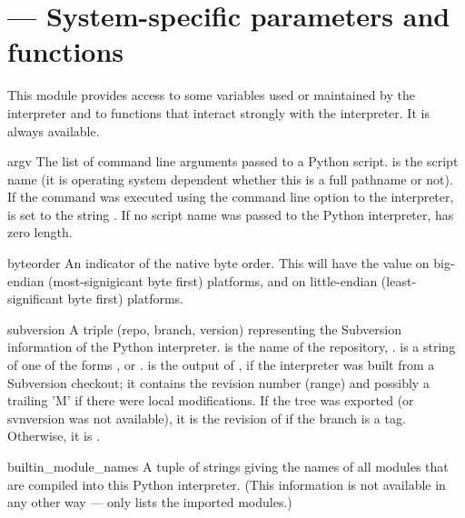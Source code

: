 \section{ ---
         System-specific parameters and functions}


This module provides access to some variables used or maintained by the
interpreter and to functions that interact strongly with the interpreter.
It is always available.


\begin{datadesc}{argv}
  The list of command line arguments passed to a Python script.
   is the script name (it is operating system dependent
  whether this is a full pathname or not).  If the command was
  executed using the  command line option to the
  interpreter,  is set to the string .  If no
  script name was passed to the Python interpreter,  has
  zero length.
\end{datadesc}

\begin{datadesc}{byteorder}
  An indicator of the native byte order.  This will have the value
   on big-endian (most-signigicant byte first) platforms,
  and  on little-endian (least-significant byte first)
  platforms.
\end{datadesc}

\begin{datadesc}{subversion}
  A triple (repo, branch, version) representing the Subversion
  information of the Python interpreter.
   is the name of the repository, .
   is a string of one of the forms ,
   or .
   is the output of , if the
  interpreter was built from a Subversion checkout; it contains
  the revision number (range) and possibly a trailing 'M' if
  there were local modifications. If the tree was exported
  (or svnversion was not available), it is the revision of
   if the branch is a tag. Otherwise,
  it is .
\end{datadesc}  

\begin{datadesc}{builtin_module_names}
  A tuple of strings giving the names of all modules that are compiled
  into this Python interpreter.  (This information is not available in
  any other way ---  only lists the imported
  modules.)
\end{datadesc}

